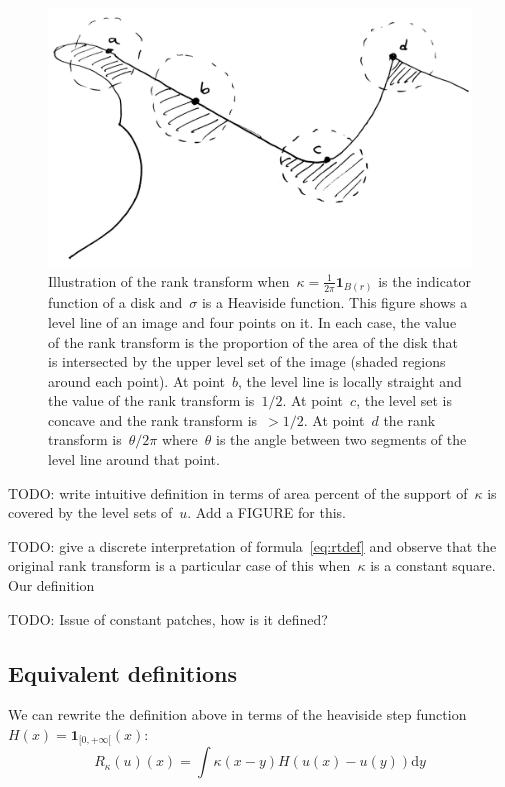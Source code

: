 \documentclass[12pt]{article}                  %
\begin{document}
\begin{figure}
	\centering
	\includegraphics[width=0.6\linewidth]{f/figure1.png}
	\caption{
		Illustration of the rank transform
		when~$\kappa=\frac1{2\pi}\mathbf{1}_{B(r)}$ is the
		indicator function of a disk and~$\sigma$ is a Heaviside
		function.
		This figure shows a level line of an image and four points
		on it.  In each case, the value of the rank transform is the
		proportion of the area of the disk that is intersected by
		the upper level set of the image (shaded regions around each
		point).
		At point~$b$, the level line is locally straight and the
		value of the rank transform is~$1/2$.  At point~$c$, the
		level set is concave and the rank transform is~$>1/2$.  At
		point~$d$ the rank transform is~$\theta/{2\pi}$
		where~$\theta$ is the angle between two segments of the
		level line around that point.
	}
	\label{fig:figure1}
\end{figure}

TODO: write intuitive definition in terms of area percent of the support
of~$\kappa$ is covered by the level sets of~$u$.  Add a FIGURE for this.

TODO: give a discrete interpretation of formula~\ref{eq:rtdef} and observe
that the original rank transform is a particular case of this when~$\kappa$
is a constant square.
Our definition

TODO: Issue of constant patches, how is it defined?


\subsection{Equivalent definitions}

We can rewrite the definition above in terms of the heaviside step
function~$H(x)=\mathbf{1}_{[0,+\infty[}(x)$:
\begin{equation}
R_\kappa(u)(x)=
\int
\kappa(x-y)
H\left(u\left(x\right)-u\left(y\right)\right)
\mathrm{d} y
\end{equation}
\end{document}

